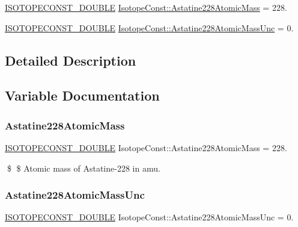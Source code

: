 \begin{DoxyCompactItemize}
\item 
\mbox{\hyperlink{group___isotope_const-_macros_ga8f45a7272ce02c0b4c65c44636ed719a}{I\+S\+O\+T\+O\+P\+E\+C\+O\+N\+S\+T\+\_\+\+D\+O\+U\+B\+LE}} \mbox{\hyperlink{group___isotope_const-_astatine-_at228_ga0a5c38e19c3778858f037ab6539b575b}{Isotope\+Const\+::\+Astatine228\+Atomic\+Mass}} = 228.
\item 
\mbox{\hyperlink{group___isotope_const-_macros_ga8f45a7272ce02c0b4c65c44636ed719a}{I\+S\+O\+T\+O\+P\+E\+C\+O\+N\+S\+T\+\_\+\+D\+O\+U\+B\+LE}} \mbox{\hyperlink{group___isotope_const-_astatine-_at228_gab7ddfabf68540a8024291d663b5c607f}{Isotope\+Const\+::\+Astatine228\+Atomic\+Mass\+Unc}} = 0.
\end{DoxyCompactItemize}


\subsection{Detailed Description}


\subsection{Variable Documentation}
\mbox{\label{group___isotope_const-_astatine-_at228_ga0a5c38e19c3778858f037ab6539b575b}} 
\subsubsection{\texorpdfstring{Astatine228\+Atomic\+Mass}{Astatine228AtomicMass}}
{\footnotesize\ttfamily \mbox{\hyperlink{group___isotope_const-_macros_ga8f45a7272ce02c0b4c65c44636ed719a}{I\+S\+O\+T\+O\+P\+E\+C\+O\+N\+S\+T\+\_\+\+D\+O\+U\+B\+LE}} Isotope\+Const\+::\+Astatine228\+Atomic\+Mass = 228.}

\$ \$ Atomic mass of Astatine-\/228 in amu. \mbox{\label{group___isotope_const-_astatine-_at228_gab7ddfabf68540a8024291d663b5c607f}} 
\subsubsection{\texorpdfstring{Astatine228\+Atomic\+Mass\+Unc}{Astatine228AtomicMassUnc}}
{\footnotesize\ttfamily \mbox{\hyperlink{group___isotope_const-_macros_ga8f45a7272ce02c0b4c65c44636ed719a}{I\+S\+O\+T\+O\+P\+E\+C\+O\+N\+S\+T\+\_\+\+D\+O\+U\+B\+LE}} Isotope\+Const\+::\+Astatine228\+Atomic\+Mass\+Unc = 0.}

